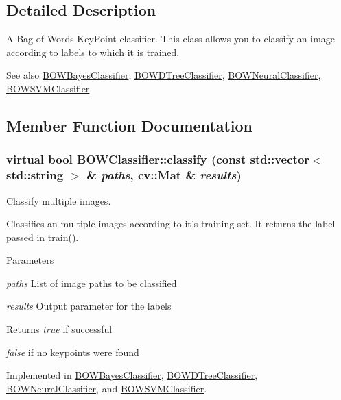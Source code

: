\subsection{Detailed Description}
A Bag of Words KeyPoint classifier. This class allows you to classify an image according to labels to which it is trained.

\begin{DoxySeeAlso}{See also}
\hyperlink{classBOWBayesClassifier}{BOWBayesClassifier}, \hyperlink{classBOWDTreeClassifier}{BOWDTreeClassifier}, \hyperlink{classBOWNeuralClassifier}{BOWNeuralClassifier}, \hyperlink{classBOWSVMClassifier}{BOWSVMClassifier} 
\end{DoxySeeAlso}


\subsection{Member Function Documentation}
\hypertarget{classBOWClassifier_a0785d39115372051816210d8d2c0335e}{
\subsubsection[{classify}]{\setlength{\rightskip}{0pt plus 5cm}virtual bool BOWClassifier::classify (const std::vector$<$ std::string $>$ \& {\em paths}, \/  cv::Mat \& {\em results})}}
\label{classBOWClassifier_a0785d39115372051816210d8d2c0335e}


Classify multiple images. 

Classifies an multiple images according to it's training set. It returns the label passed in \hyperlink{classBOWClassifier_a8a00f5cadf166f361a411d5a4e67b4d6}{train()}.


\begin{DoxyParams}{Parameters}
\item[{\em paths}]List of image paths to be classified \item[{\em results}]Output parameter for the labels \end{DoxyParams}
\begin{DoxyReturn}{Returns}
{\itshape true\/} if successful\par
 {\itshape false\/} if no keypoints were found 
\end{DoxyReturn}


Implemented in \hyperlink{classBOWBayesClassifier_a3e2cf634f1f63dd14de1ca658b19cb39}{BOWBayesClassifier}, \hyperlink{classBOWDTreeClassifier_a5fcc85024df510e3c9ec813fe09e23fe}{BOWDTreeClassifier}, \hyperlink{classBOWNeuralClassifier_afbb503e23b8f881917ab1ea1cc6e2ece}{BOWNeuralClassifier}, and \hyperlink{classBOWSVMClassifier_a77d77f5172e9665b3ef5154e52db9721}{BOWSVMClassifier}.

